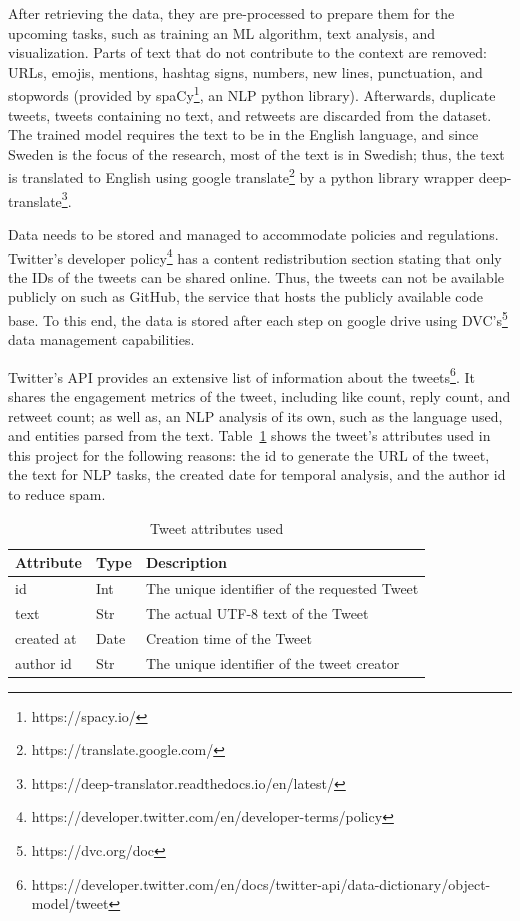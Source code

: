 After retrieving the data, they are pre-processed to prepare them for the upcoming tasks, such as training an
\ac{ML} algorithm, text analysis, and visualization.  Parts of text that do not contribute to the
context are removed: \ac{URL}s, emojis, mentions, hashtag signs, numbers, new lines, punctuation,
and stopwords (provided by spaCy\footnote{https://spacy.io/}, an \ac{NLP} python library).
Afterwards, duplicate tweets, tweets containing no text, and retweets are discarded from the
dataset. The trained model requires the text to be in the English language, and since Sweden
is the focus of the research, most of the text is in Swedish; thus, the text is translated to
English using google translate\footnote{https://translate.google.com/} by a python library wrapper
deep-translate\footnote{https://deep-translator.readthedocs.io/en/latest/}. 

Data needs to be stored and managed to accommodate policies and regulations. Twitter's developer
policy\footnote{https://developer.twitter.com/en/developer-terms/policy} has a content
redistribution section stating that only the IDs of the tweets can be shared online. Thus, the
tweets can not be available publicly on such as GitHub, the service that hosts the publicly available
code base. To this end, the data is stored after each step on google drive using
\ac{DVC}'s\footnote{https://dvc.org/doc} data management capabilities.


Twitter's API provides an extensive list of information about the
tweets\footnote{https://developer.twitter.com/en/docs/twitter-api/data-dictionary/object-model/tweet}.
It shares the engagement metrics of the tweet, including like count, reply count, and retweet count;
as well as, an \ac{NLP} analysis of its own, such as the language used, and entities parsed from the
text. Table~\ref{tab:tweet_attr} shows the tweet's attributes used in this project for the following reasons: the id to
generate the \ac{URL} of the tweet, the text for \ac{NLP} tasks, the created date for temporal
analysis, and the author id to reduce spam.

\begin{table}
  \center
  \begin{tabular}{|l|l|l|}
    \hline
    Attribute & Type & Description \\
    \hline
    id & Int & The unique identifier of the requested Tweet \\
    \hline
    text & Str & The actual UTF-8 text of the Tweet \\
    \hline
    created at & Date  & Creation time of the Tweet \\
    \hline
    author id & Str & The unique identifier of the tweet creator \\
    \hline
  \end{tabular}
  \caption{Tweet attributes used}
  \label{tab:tweet_attr}
\end{table}

